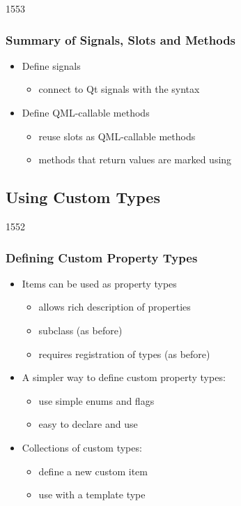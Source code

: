 \begin{slide}{1553}\frametitle{Summary of Signals, Slots and Methods}

\begin{itemize}
\item Define signals
  \begin{itemize}
  \item connect to Qt signals with the  syntax
  \end{itemize}
\item Define QML-callable methods
  \begin{itemize}
  \item reuse slots as QML-callable methods
  \item methods that return values are marked using 
  \end{itemize}
\end{itemize}

\end{slide}
                             

\subsection{Using Custom Types}

\begin{slide}{1552}\frametitle{Defining Custom Property Types}

\begin{itemize}
\item Items can be used as property types
  \begin{itemize}
  \item allows rich description of properties
  \item subclass  (as before)
  \item requires registration of types (as before)
  \end{itemize}

\vspace*{0.5em}
\item A simpler way to define custom property types:
  \begin{itemize}
  \item use simple enums and flags
  \item easy to declare and use
  \end{itemize}

\vspace*{0.5em}
\item Collections of custom types:
  \begin{itemize}
  \item define a new custom item
  \item use with a  template type
  \end{itemize}
\end{itemize}

\end{slide}

